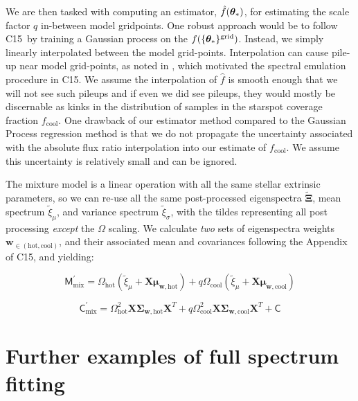 \documentclass[twocolumn]{emulateapj}%
\newcommand{\iancze}{{\sc C15}}
\begin{document}
We are then tasked with computing an estimator, $\hat f({\bm \theta}_{\ast})$, for estimating the scale factor $q$ in-between model gridpoints.  One robust approach would be to follow \iancze\ by training a Gaussian process on the $f(\{{\bm \theta}_{\ast}\}^\textrm{grid})$.  Instead, we simply linearly interpolated between the model grid-points.  Interpolation can cause pile-up near model grid-points, as noted in \citet{cottaar14}, which motivated the spectral emulation procedure in \iancze.  We assume the interpolation of $\hat f$ is smooth enough that we will not see such pileups and if even we did see pileups, they would mostly be discernable as kinks in the distribution of samples in the starspot coverage fraction $f_{\mathrm{cool}}$.  One drawback of our estimator method compared to the Gaussian Process regression method is that we do not propagate the uncertainty associated with the absolute flux ratio interpolation into our estimate of $f_{\mathrm{cool}}$.  We assume this uncertainty is relatively small and can be ignored.

The mixture model is a linear operation with all the same stellar extrinsic parameters, so we can re-use all the same post-processed eigenspectra $\widetilde{\mathbf{\Xi}}$, mean spectrum $\widetilde{\xi}_\mu$, and variance spectrum $\widetilde{\xi}_\sigma$, with the tildes representing all post processing \emph{except} the $\Omega$ scaling.  We calculate \emph{two} sets of eigenspectra weights $\mathbf{w}_{\in (\mathrm{hot}, \mathrm{cool})}$, and their associated mean and covariances following the Appendix of \iancze, and yielding:

\begin{equation}
  \mathsf{M}_{\mathrm{mix}}^\prime = \Omega_{\mathrm{hot}} (\widetilde{\xi}_\mu + \mathbf{X} \mathbf{\mu}_{\mathbf{w}, \mathrm{hot}}) + q \Omega_{\mathrm{cool}} (\widetilde{\xi}_\mu + \mathbf{X} \mathbf{\mu}_{\mathbf{w}, \mathrm{cool}})
\end{equation}

\begin{equation}
  \mathsf{C}_{\mathrm{mix}}^\prime = \Omega_{\mathrm{hot}}^2 \mathbf{X} \mathbf{\Sigma}_\mathbf{w, \mathrm{hot}} \mathbf{X}^T + q \Omega_{\mathrm{cool}}^2 \mathbf{X} \mathbf{\Sigma}_\mathbf{w, \mathrm{cool}} \mathbf{X}^T + \mathsf{C}
  \label{eqn:modC}
\end{equation}


\section{Further examples of full spectrum fitting}
\end{document}
